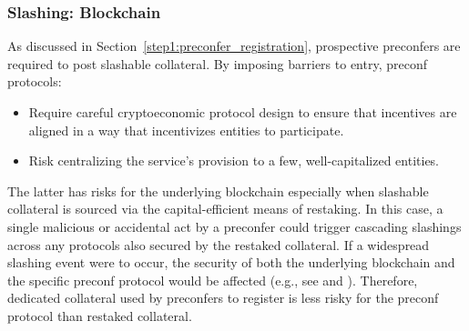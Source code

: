 \documentclass[a4paper]{article}
\theoremstyle{boldstyle}
\newcommand{\qb}[1]{\textcolor{red}{\textbf{Quentin:} #1}}
\begin{document}
    \subsubsection{Slashing: Blockchain}
    \label{risk_slashing:protocol}
        As discussed in Section~\ref{step1:preconfer_registration}, prospective preconfers are required to post slashable collateral. By imposing barriers to entry, preconf protocols:
        \begin{itemize}
            \item Require careful cryptoeconomic protocol design to ensure that incentives are aligned in a way that incentivizes entities to participate.
            \item Risk centralizing the service's provision to a few, well-capitalized entities. 
        \end{itemize}
        The latter has risks for the underlying blockchain especially when slashable collateral is sourced via the capital-efficient means of restaking.
        In this case, a single malicious or accidental act by a preconfer could trigger cascading slashings across any protocols also secured by the restaked collateral. 
        If a widespread slashing event were to occur, the security of both the underlying blockchain and the specific preconf protocol would be affected (e.g., see \cite{risk_restaking} and \cite{W:Restaking101:APrimeronEigenLayer}).
        Therefore, dedicated collateral used by preconfers to register is less risky for the preconf protocol than restaked collateral.
        
\end{document}
